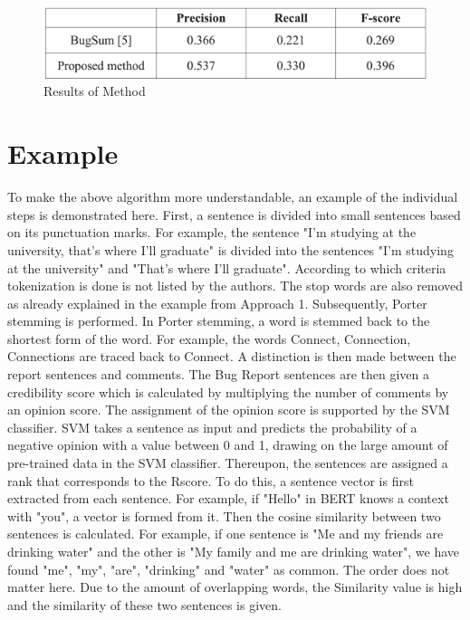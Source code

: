 \documentclass[a4paper,10pt, bibliography=totocnumbered]{scrreprt}
\begin{document}
\begin{figure}
\centering
\includegraphics[scale=0.65]{../images/Thema10_ergebnisse.PNG}
\caption{Results of Method}
\label{fig:ergebnisse}
\end{figure}


\section{Example}
To make the above algorithm more understandable, an example of the individual steps is demonstrated here.
First, a sentence is divided into small sentences based on its punctuation marks. For example, the sentence "I'm studying at the university, that's where I'll graduate" is divided into the sentences "I'm studying at the university" and "That's where I'll graduate". According to which criteria tokenization is done is not listed by the authors. The stop words are also removed as already explained in the example from Approach 1. Subsequently, Porter stemming is performed. In Porter stemming, a word is stemmed back to the shortest form of the word. For example, the words Connect, Connection, Connections are traced back to Connect. A distinction is then made between the report sentences and comments. The Bug Report sentences are then given a credibility score which is calculated by multiplying the number of comments by an opinion score. The assignment of the opinion score is supported by the SVM classifier. SVM takes a sentence as input and predicts the probability of a negative opinion with a value between 0 and 1, drawing on the large amount of pre-trained data in the SVM classifier. Thereupon, the sentences are assigned a rank that corresponds to the Rscore. To do this, a sentence vector is first extracted from each sentence. For example, if "Hello" in BERT knows a context with "you", a vector is formed from it. Then the cosine similarity between two sentences is calculated. For example, if one sentence is "Me and my friends are drinking water" and the other is "My family and me are drinking water", we have found "me", "my", "are", "drinking" and "water" as common. The order does not matter here. Due to the amount of overlapping words, the Similarity value is high and the similarity of these two sentences is given. 
\end{document}
